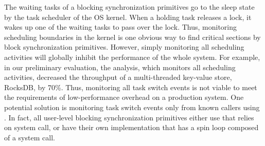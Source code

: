 The waiting tasks of a blocking synchronization primitives go to the sleep
state by the task scheduler of the OS kernel. When a holding task releases
a lock, it wakes up one of the waiting tasks to pass over the lock. Thus,
monitoring scheduling boundaries in the kernel is one obvious way to
find critical sections by block synchronization primitives. However, simply
monitoring all scheduling activities will globally inhibit the
performance of the whole system.
For example, in our preliminary evaluation, the 
analysis, which monitors all scheduling activities, decreased the
throughput of a multi-threaded key-value store, RocksDB, by
70\%. Thus, monitoring all task switch events is not viable to
meet the requirements of low-performance overhead on a production
system. One potential solution is monitoring task switch events only from known
callers using \kprobe. In fact, all user-level blocking
synchronization primitives either use  that relies on
 system call, or have their own implementation that has a spin
loop composed of a  system call.

%
%
